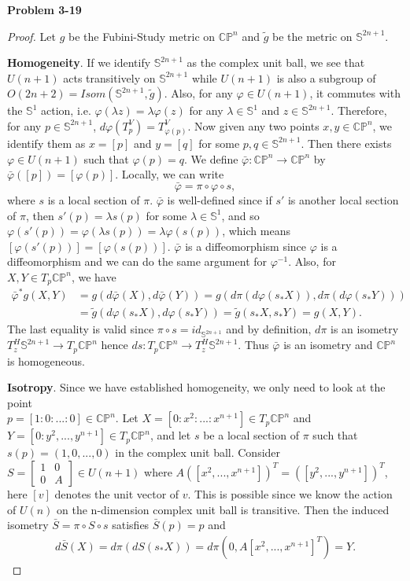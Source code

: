 \documentclass[11pt, a4paper]{article}
\theoremstyle{plain}
\theoremstyle{definition}
\theoremstyle{remark}
\newcommand{\cC}{\mathbb{C}}
\newcommand{\cS}{\mathbb{S}}
\newcommand{\cP}{\mathbb{P}}
\newcommand{\tg}{\tilde{g}}
\begin{document}
\newcommand{\cpn}{\cC\cP^n}
\newcommand{\csn}{\cS^{2n+1}}
\newcommand{\bphi}{\bar{\varphi}}
\noindent\textbf{Problem 3-19}
\begin{proof}
    Let $g$ be the Fubini-Study metric on $\cC\cP^n$ and $\tg$ be the metric on $\cS^{2n+1}$.

    \textbf{Homogeneity}. If we identify $\cS^{2n+1}$ as the complex unit ball, we see that $U(n+1)$ acts transitively on
    $\cS^{2n+1}$ while $U(n+1)$ is also a subgroup of $O(2n+2) = Isom(\cS^{2n+1}, \tg)$. Also, for any $\varphi \in U(n+1)$, 
    it commutes with the $\cS^1$ action, i.e. $\varphi(\lambda z) = \lambda \varphi(z)$ for any $\lambda \in \cS^1$ and $z\in \cS^{2n+1}$.
    Therefore, for any $p\in \csn$, $d\varphi(T_p^V) = T_{\varphi(p)}^V$. Now given any two points $x,y\in \cpn$, we identify them
    as $x = [p]$ and $y = [q]$ for some $p,q\in \csn$. Then there exists $\varphi \in U(n+1)$ such that $\varphi(p) = q$.
    We define $\bphi: \cpn \to \cpn$ by $\bphi([p]) = [\varphi(p)]$. Locally, we can write
    \[ \bphi = \pi \circ \varphi \circ s, \]
    where $s$ is a local section of $\pi$. $\bphi$ is well-defined since if $s'$ is another local section of $\pi$, then $s'(p) = \lambda s(p)$ for some $\lambda \in \cS^1$, and so $\varphi(s'(p)) = \varphi(\lambda s(p)) = \lambda \varphi(s(p))$, which means $[\varphi(s'(p))] = [\varphi(s(p))]$.
    $\bphi$ is a diffeomorphism since $\varphi$ is a diffeomorphism and we can do the same argument for $\varphi^{-1}$. Also, for
    $X,Y \in T_p\cpn$, we have
    \begin{align*}
        \bphi^* g(X,Y) &= g(d\bphi(X), d\bphi(Y)) = g(d\pi(d\varphi(s_*X)), d\pi(d\varphi(s_*Y))) \\
        &= \tg(d\varphi(s_*X), d\varphi(s_*Y)) = \tg(s_*X, s_*Y) = g(X,Y).
    \end{align*}
    The last equality is valid since $\pi\circ s = id_{\csn}$ and by definition, $d\pi$ is an isometry $T_z^H\csn \to T_p\cpn$ hence $ds:T_p\cpn \to T_z^H\csn$. Thus $\bphi$ is an isometry and $\cpn$ is homogeneous.

    \textbf{Isotropy}. Since we have established homogeneity, we only need to look at the point \\$p = [1:0:...:0] \in \cpn$.
    Let $X = [0:x^2:...:x^{n+1}] \in T_p\cpn$ and $Y = [0:y^2,...,y^{n+1}] \in T_p\cpn$, and let $s$ be a local section of $\pi$ such that $s(p) = (1,0,...,0)$ in the complex unit ball. 
    Consider $S = \left[\begin{matrix}
        1 & 0 \\ 0 & A
    \end{matrix}\right] \in U(n+1)$ where $A([x^2,...,x^{n+1}])^T = ([y^2,...,y^{n+1}])^T$, here $[v]$ denotes the unit vector of $v$. This is possible since we know the action of
    $U(n)$ on the n-dimension complex unit ball is transitive. Then the induced isometry
    $\bar{S} = \pi \circ S \circ s$ satisfies $\bar{S}(p) = p$ and \
    \begin{align*}
        d\bar{S} (X) = d\pi(dS(s_*X)) = d\pi(0, A[x^2,...,x^{n+1}]^T) = Y.
    \end{align*}
    

\end{proof}
\end{document}

